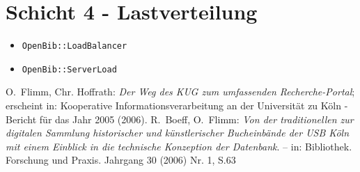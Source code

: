 \documentclass[11pt, twoside, a4paper, BCOR8mm, DIV12, bibtotoc,idxtotoc]{scrbook}
\begin{document}
\section{Schicht 4 - Lastverteilung}

\begin{itemize}
\item \texttt{OpenBib::LoadBalancer}
\item \texttt{OpenBib::ServerLoad}
\end{itemize}


\begin{thebibliography}{ChBr82}
\originalTeX

 O.~Flimm, Chr. Hoffrath: \emph{Der
    Weg des KUG zum umfassenden Recherche-Portal}; erscheint in:
  Kooperative Informationsverarbeitung an der Universität zu Köln -
  Bericht für das Jahr 2005 (2006).
 R.~Boeff, O.~Flimm: \emph{Von
    der traditionellen zur digitalen Sammlung historischer und
    künstlerischer Bucheinbände der USB Köln mit einem Einblick in die
    technische Konzeption der Datenbank}. -- in: Bibliothek. Forschung
  und Praxis. Jahrgang 30 (2006) Nr. 1, S.63
\end{thebibliography}
\germanTeX
\end{document}
